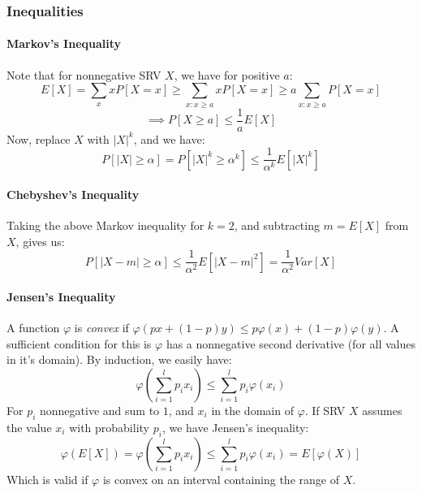 \documentclass[12pt,a4paper]{article}
\newcommand{\1}[1]{\mathbbm{1}\left\{ #1 \right\}}
\begin{document}
\subsubsection{Inequalities}
\paragraph{Markov's Inequality} Note that for nonnegative SRV $X$, we have for positive $a$:
$$
	E[X] = \sum_x xP[X = x] \geq \sum_{x: x \geq a} xP[X = x] \geq a \sum_{x: x \geq a} P[X = x]
$$
$$
	\implies
	P[X \geq a] \leq \frac{1}{a}E[X]
$$
Now, replace $X$ with $|X|^k$, and we have:
$$
	P[|X| \geq \alpha] = P[|X|^k \geq \alpha^k] \leq \frac{1}{\alpha^k} E\left[|X|^k\right]
$$

\paragraph{Chebyshev's Inequality} Taking the above Markov inequality for $k = 2$, and subtracting $m = E[X]$ from $X$, gives us:
$$
	P\left[|X - m| \geq \alpha\right] \leq \frac{1}{\alpha^2} E\left[|X - m|^2\right] = \frac{1}{\alpha^2}Var[X]
$$

\paragraph{Jensen's Inequality} A function $\varphi$ is \textit{convex} if $\varphi(px + (1-p)y) \leq p\varphi(x) + (1-p)\varphi(y)$. A sufficient condition for this is $\varphi$ has a nonnegative second derivative (for all values in it's domain). By induction, we easily have:
$$
	\varphi\left(\sum_{i=1}^l p_i x_i\right) \leq \sum_{i=1}^l p_i\varphi(x_i)
$$
For $p_i$ nonnegative and sum to $1$, and $x_i$ in the domain of $\varphi$. If SRV $X$ assumes the value $x_i$ with probability $p_i$, we have Jensen's inequality:
$$
	\varphi\left(E[X]\right) =
	\varphi\left(\sum_{i=1}^l p_i x_i\right) \leq \sum_{i=1}^l p_i\varphi(x_i) =
	E\left[\varphi(X)\right]
$$
Which is valid if $\varphi$ is convex on an interval containing the range of $X$.
\end{document}
